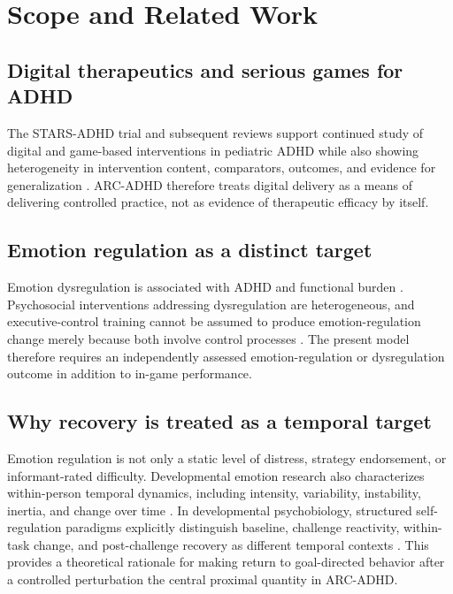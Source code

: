 \section{Scope and Related Work}

\subsection{Digital therapeutics and serious games for ADHD}

The STARS-ADHD trial and subsequent reviews support continued study of digital and game-based interventions in pediatric ADHD while also showing heterogeneity in intervention content, comparators, outcomes, and evidence for generalization \parencite{kollins2020stars,oh2024dtx,lin2025seriousgames,schultz2025content,tommasi2026serious}. ARC-ADHD therefore treats digital delivery as a means of delivering controlled practice, not as evidence of therapeutic efficacy by itself.

\subsection{Emotion regulation as a distinct target}

Emotion dysregulation is associated with ADHD and functional burden \parencite{graziano2016dysregulation}. Psychosocial interventions addressing dysregulation are heterogeneous, and executive-control training cannot be assumed to produce emotion-regulation change merely because both involve control processes \parencite{vacher2020psychosocial,groves2022emotion}. The present model therefore requires an independently assessed emotion-regulation or dysregulation outcome in addition to in-game performance.

\subsection{Why recovery is treated as a temporal target}

Emotion regulation is not only a static level of distress, strategy endorsement, or informant-rated difficulty. Developmental emotion research also characterizes within-person temporal dynamics, including intensity, variability, instability, inertia, and change over time \parencite{reitsema2022emotiondynamics}. In developmental psychobiology, structured self-regulation paradigms explicitly distinguish baseline, challenge reactivity, within-task change, and post-challenge recovery as different temporal contexts \parencite{davis2020context}. This provides a theoretical rationale for making return to goal-directed behavior after a controlled perturbation the central proximal quantity in ARC-ADHD.

